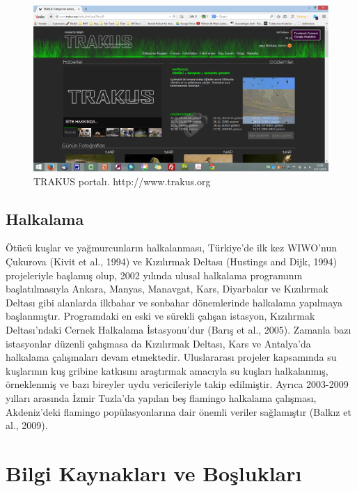 \documentclass[
  a4paper,
  DIV=11,
  numbers=noendperiod]{scrartcl}
\begin{document}
\begin{figure}[H]

{\centering \includegraphics{images/trakus.png}

}

\caption{TRAKUS portalı. http://www.trakus.org}

\end{figure}%

\section*{Halkalama}\label{halkalama}


Ötücü kuşlar ve yağmurcunların halkalanması, Türkiye'de ilk kez WIWO'nun
Çukurova (Kivit et al., 1994) ve Kızılırmak Deltası (Hustings and Dijk,
1994) projeleriyle başlamış olup, 2002 yılında ulusal halkalama
programının başlatılmasıyla Ankara, Manyas, Manavgat, Kars, Diyarbakır
ve Kızılırmak Deltası gibi alanlarda ilkbahar ve sonbahar dönemlerinde
halkalama yapılmaya başlanmıştır. Programdaki en eski ve sürekli çalışan
istasyon, Kızılırmak Deltası'ndaki Cernek Halkalama İstasyonu'dur (Barış
et al., 2005). Zamanla bazı istasyonlar düzenli çalışmasa da Kızılırmak
Deltası, Kars ve Antalya'da halkalama çalışmaları devam etmektedir.
Uluslararası projeler kapsamında su kuşlarının kuş gribine katkısını
araştırmak amacıyla su kuşları halkalanmış, örneklenmiş ve bazı bireyler
uydu vericileriyle takip edilmiştir. Ayrıca 2003-2009 yılları arasında
İzmir Tuzla'da yapılan beş flamingo halkalama çalışması, Akdeniz'deki
flamingo popülasyonlarına dair önemli veriler sağlamıştır (Balkız et
al., 2009).


\chapter*{Bilgi Kaynakları ve
Boşlukları}\label{bilgi-kaynaklarux131-ve-boux15fluklarux131}
\end{document}
